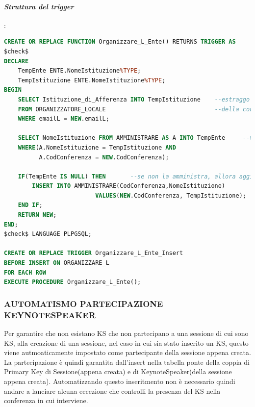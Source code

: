 \documentclass[a4page]{article}
\begin{document}
\paragraph{\textit{Struttura del trigger}}:	
\begin{lstlisting}[language=SQL,
        deletekeywords={IDENTITY,INT},
        morekeywords={clustered},    
        framesep=10pt,
        framextopmargin=10pt]
CREATE OR REPLACE FUNCTION Organizzare_L_Ente() RETURNS TRIGGER AS
$check$
DECLARE 
	TempEnte ENTE.NomeIstituzione%TYPE;
	TempIstituzione ENTE.NomeIstituzione%TYPE;
BEGIN
	SELECT Istituzione_di_Afferenza INTO TempIstituzione	--estraggo l'istituzione di afferenza dell'organizzatore
	FROM ORGANIZZATORE_LOCALE								--della conferenza appena aggiunto
	WHERE emailL = NEW.emailL;

	SELECT NomeIstituzione FROM AMMINISTRARE AS A INTO TempEnte		--verifico se l'ente amministra gia' la conferenza
	WHERE(A.NomeIstituzione = TempIstituzione AND
		  A.CodConferenza = NEW.CodConferenza);
	
	IF(TempEnte IS NULL) THEN		--se non la amministra, allora aggiungo l'ente dell'organizzatore a quelli che amministrano la conferenza
		INSERT INTO AMMINISTRARE(CodConferenza,NomeIstituzione)
						  VALUES(NEW.CodConferenza, TempIstituzione);
	END IF;
	RETURN NEW;
END;
$check$ LANGUAGE PLPGSQL;

CREATE OR REPLACE TRIGGER Organizzare_L_Ente_Insert
BEFORE INSERT ON ORGANIZZARE_L
FOR EACH ROW
EXECUTE PROCEDURE Organizzare_L_Ente();        
\end{lstlisting}
\newpage
\subsubsection{AUTOMATISMO PARTECIPAZIONE KEYNOTESPEAKER}
Per garantire che non esistano KS che non partecipano a una sessione di cui sono KS, alla creazione di una sessione, nel caso in cui sia stato inserito un KS, questo viene autmoaticamente impostato come partecipante della sessione appena creata. La partecipazione è quindi garantita dall'insert nella tabella ponte della coppia di Primary Key di Sessione(appena creata) e di KeynoteSpeaker(della sessione appena creata). Automatizzando questo inseritmento non è necessario quindi andare a lanciare alcuna eccezione che controlli la presenza del KS nella conferenza in cui interviene.
\vspace{1cm}
\end{document}

